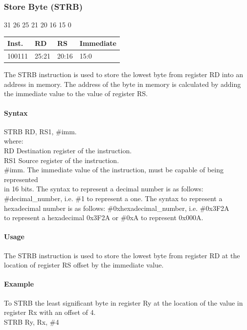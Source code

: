 \documentclass[12pt]{article}
\newcommand{\iTypeInstruction}[6]
{%
    \hspace{1.6cm}31 \hspace{1.15cm}26 \hspace{.05cm}25 \hspace{.8cm}21 \hspace{.05cm}20 \hspace{.8cm}16 \hspace{.05cm}15 \hspace{6.4cm}0
    \vspace{-.25cm}
    \begin{center}
        \begin{tabular}{ |p{1.8cm}|p{1.5cm}|p{1.5cm}|p{6.8cm}| }
            \hline
            \textbf{Inst.} & \textbf{RD} &  \textbf{RS} & \textbf{Immediate}\\
            \hline
            #1 & 25:21 & 20:16 &15:0\\
            \hline
        \end{tabular}
    \end{center}
    
    \noindent
    #2
    
    \paragraph{Syntax}
    \begin{flushleft}
    #3 RD, RS1, \#imm.\\
    \vspace{1em}        %
    where:\\
    \vspace{1em}
    RD  \hspace{3.6em} Destination register of the instruction.\\
    \vspace{1em}
    RS1  \hspace{3.35em} Source register of the instruction.\\
    \vspace{1em}
    \#imm.  \hspace{1.8em} The immediate value of the instruction, must be capable of being represented\\             \hspace{5.4em} in 16 bits. The syntax to represent a decimal number is as follows:\\
            \hspace{5.4em} \#decimal\_number, i.e. \#1 to represent a one. The syntax to represent a\\
            \hspace{5.4em} hexadecimal number is as follows: \#0xhexadecimal\_number, i.e. \#0x3F2A \\
            \hspace{5.4em} to represent a hexadecimal 0x3F2A or \#0xA to represent 0x000A.\\
    \end{flushleft}
    
    \paragraph{Usage}
    \begin{flushleft}
    #4\\
    \end{flushleft}
    \paragraph{Example}
    \begin{flushleft}
    #5\\
    \vspace{1em}
    #6
    \end{flushleft}}
\begin{document}

    \newpage
    \subsubsection{Store Byte (STRB)}
    
    \iTypeInstruction
    {100111}
    {The STRB instruction is used to store the lowest byte from register RD into an address in memory. The address of the byte in memory is calculated by adding the immediate value to the value of register RS.}
    {STRB}
    {The STRB instruction is used to store the lowest byte from register RD at the location of register RS offset by the immediate value.}
    {To STRB the least significant byte in register Ry at the location of the value in register Rx with an offset of 4.}
    {STRB Ry, Rx, \#4}
    
    
    
\end{document}

